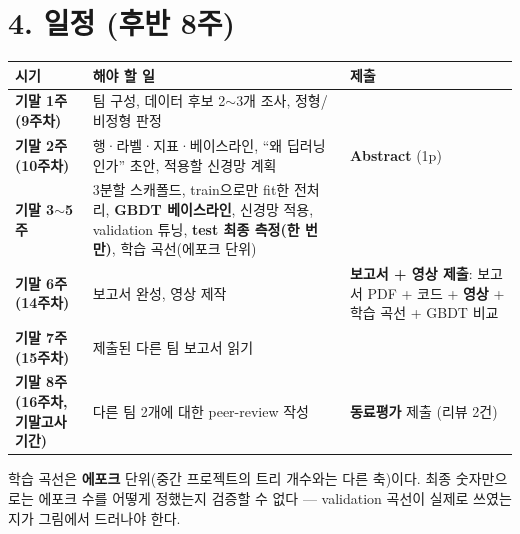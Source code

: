 \documentclass[12pt]{article}
\begin{document}
\section*{4. 일정 (후반 8주)}
\begin{center}
\small
\begin{tabular}{@{}p{3.6cm}p{5.4cm}p{3.7cm}@{}}
\toprule
\textbf{시기} & \textbf{해야 할 일} & \textbf{제출} \\
\midrule
\textbf{기말 1주(9주차)} & 팀 구성, 데이터 후보 2$\sim$3개 조사, 정형/비정형 판정 &  \\
\textbf{기말 2주(10주차)} & 행·라벨·지표·베이스라인, ``왜 딥러닝인가'' 초안, 적용할 신경망 계획 & \textbf{Abstract} (1p) \\
\textbf{기말 3$\sim$5주} & 3분할 스캐폴드, train으로만 fit한 전처리, \textbf{GBDT 베이스라인}, 신경망 적용, validation 튜닝, \textbf{test 최종 측정(한 번만)}, 학습 곡선(에포크 단위) &  \\
\textbf{기말 6주(14주차)} & 보고서 완성, 영상 제작 & \textbf{보고서 + 영상 제출}: 보고서 PDF + 코드 + \textbf{영상} + 학습 곡선 + GBDT 비교 \\
\textbf{기말 7주(15주차)} & 제출된 다른 팀 보고서 읽기 &  \\
\textbf{기말 8주(16주차, 기말고사 기간)} & 다른 팀 2개에 대한 peer-review 작성 & \textbf{동료평가} 제출 (리뷰 2건) \\
\bottomrule
\end{tabular}
\end{center}
\vspace{4pt}
학습 곡선은 \textbf{에포크} 단위(중간 프로젝트의 트리 개수와는
다른 축)이다. 최종 숫자만으로는 에포크 수를 어떻게 정했는지
검증할 수 없다 --- validation 곡선이 실제로 쓰였는지가 그림에서
드러나야 한다.
\end{document}
